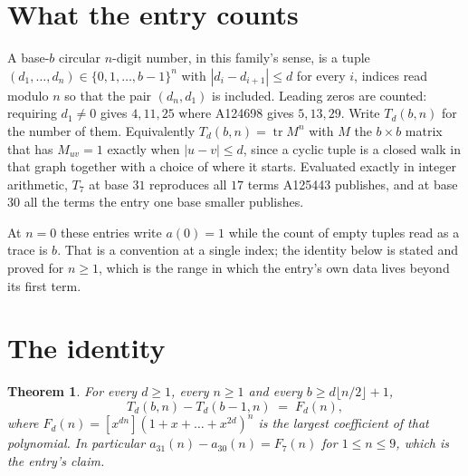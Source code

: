 \documentclass[11pt,a4paper]{article}
\theoremstyle{plain}
\newtheorem{theorem}{Theorem}
\theoremstyle{definition}
\begin{document}
\section{What the entry counts}

A base-$b$ circular $n$-digit number, in this family's sense, is a tuple
$(d_1,\dots,d_n)\in\{0,1,\dots,b-1\}^{n}$ with $|d_i-d_{i+1}|\le d$ for every $i$, indices
read modulo $n$ so that the pair $(d_n,d_1)$ is included. Leading zeros are counted: requiring
$d_1\ne0$ gives $4,11,25$ where A124698 gives $5,13,29$. Write $T_d(b,n)$ for the number of
them. Equivalently $T_d(b,n)=\operatorname{tr}M^{n}$ with $M$ the $b\times b$ matrix that has
$M_{uv}=1$ exactly when $|u-v|\le d$, since a cyclic tuple is a closed walk in that graph
together with a choice of where it starts. Evaluated exactly in integer arithmetic, $T_{7}$
at base $31$ reproduces all $17$ terms A125443 publishes, and at base $30$ all the
terms the entry one base smaller publishes.

At $n=0$ these entries write $a(0)=1$ while the count of empty tuples read as a trace is $b$.
That is a convention at a single index; the identity below is stated and proved for $n\ge1$,
which is the range in which the entry's own data lives beyond its first term.

\section{The identity}

\begin{theorem}
For every $d\ge1$, every $n\ge1$ and every $b\ge d\lfloor n/2\rfloor+1$,
\[
T_d(b,n)-T_d(b-1,n)\;=\;F_d(n),
\]
where $F_d(n)=[x^{dn}](1+x+\dots+x^{2d})^{n}$ is the largest coefficient of that
polynomial. In particular $a_{31}(n)-a_{30}(n)=F_{7}(n)$ for $1\le n\le9$, which
is the entry's claim.
\end{theorem}
\end{document}
